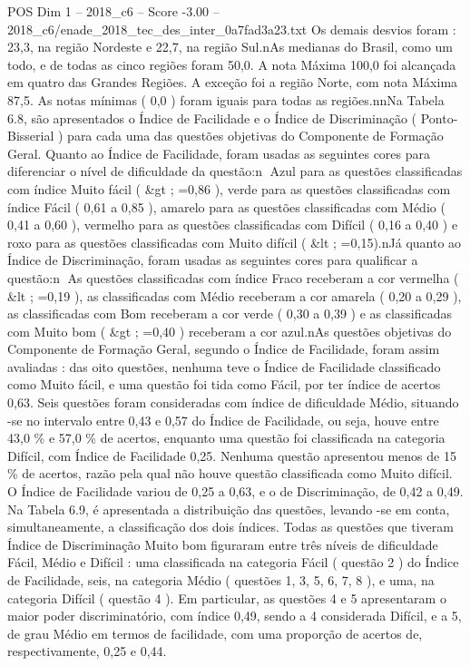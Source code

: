 \begin{textsample}{POS Dim 1 – 2018\_c6 – Score -3.00 – 2018\_c6/enade\_2018\_tec\_des\_inter\_0a7fad3a23.txt}
Os demais desvios foram : 23,3, na região Nordeste e 22,7, na região Sul.nAs medianas do Brasil, como um todo, e de todas as cinco regiões foram 50,0.
A nota Máxima 100,0 foi alcançada em quatro das Grandes Regiões.
A exceção foi a região Norte, com nota Máxima 87,5.
As notas mínimas ( 0,0 ) foram iguais para todas as regiões.nnNa Tabela 6.8, são apresentados o Índice de Facilidade e o Índice de Discriminação ( Ponto-Bisserial ) para cada uma das questões objetivas do Componente de Formação Geral.
Quanto ao Índice de Facilidade, foram usadas as seguintes cores para diferenciar o nível de dificuldade da questão:n Azul para as questões classificadas com índice Muito fácil ( \&gt ; =0,86 ), verde para as questões classificadas com índice Fácil ( 0,61 a 0,85 ), amarelo para as questões classificadas com Médio ( 0,41 a 0,60 ), vermelho para as questões classificadas com Difícil ( 0,16 a 0,40 ) e roxo para as questões classificadas com Muito difícil ( \&lt ; =0,15).nJá quanto ao Índice de Discriminação, foram usadas as seguintes cores para qualificar a questão:n As questões classificadas com índice Fraco receberam a cor vermelha ( \&lt ; =0,19 ), as classificadas com Médio receberam a cor amarela ( 0,20 a 0,29 ), as classificadas com Bom receberam a cor verde ( 0,30 a 0,39 ) e as classificadas com Muito bom ( \&gt ; =0,40 ) receberam a cor azul.nAs questões objetivas do Componente de Formação Geral, segundo o Índice de Facilidade, foram assim avaliadas : das oito questões, nenhuma teve o Índice de Facilidade classificado como Muito fácil, e uma questão foi tida como Fácil, por ter índice de acertos 0,63.
Seis questões foram consideradas com índice de dificuldade Médio, situando -se no intervalo entre 0,43 e 0,57 do Índice de Facilidade, ou seja, houve entre 43,0 \% e 57,0 \% de acertos, enquanto uma questão foi classificada na categoria Difícil, com Índice de Facilidade 0,25.
Nenhuma questão apresentou menos de 15 \% de acertos, razão pela qual não houve questão classificada como Muito difícil.
O Índice de Facilidade variou de 0,25 a 0,63, e o de Discriminação, de 0,42 a 0,49.
Na Tabela 6.9, é apresentada a distribuição das questões, levando -se em conta, simultaneamente, a classificação dos dois índices.
Todas as questões que tiveram Índice de Discriminação Muito bom figuraram entre três níveis de dificuldade Fácil, Médio e Difícil : uma classificada na categoria Fácil ( questão 2 ) do Índice de Facilidade, seis, na categoria Médio ( questões 1, 3, 5, 6, 7, 8 ), e uma, na categoria Difícil ( questão 4 ).
Em particular, as questões 4 e 5 apresentaram o maior poder discriminatório, com índice 0,49, sendo a 4 considerada Difícil, e a 5, de grau Médio em termos de facilidade, com uma proporção de acertos de, respectivamente, 0,25 e 0,44.

\end{textsample}
